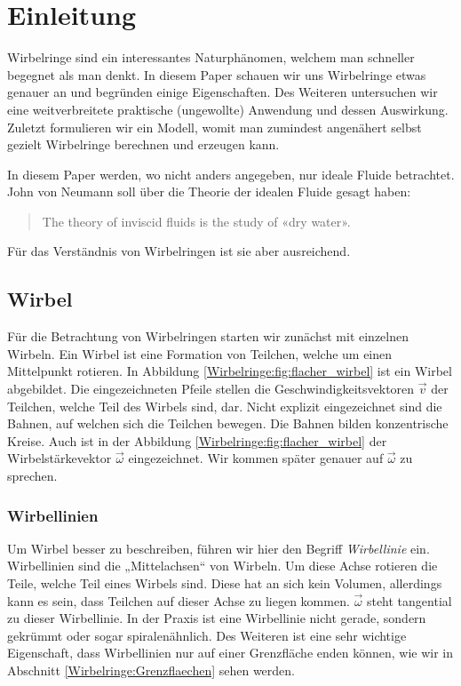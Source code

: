 %
%
%
\section{Einleitung}

Wirbelringe sind ein interessantes Naturphänomen, welchem man schneller begegnet als man denkt. 
In diesem Paper schauen wir uns Wirbelringe etwas genauer an und begründen einige Eigenschaften. 
Des Weiteren untersuchen wir eine weitverbreitete praktische (ungewollte) Anwendung und dessen Auswirkung. 
Zuletzt formulieren wir ein Modell, womit man zumindest angenähert selbst gezielt Wirbelringe berechnen und erzeugen kann.

In diesem Paper werden, wo nicht anders angegeben, nur ideale Fluide betrachtet.
John von Neumann soll über die Theorie der idealen Fluide gesagt haben\cite{Wirbelringe:feynman1964lectures}: 
\begin{quote}
    The theory of inviscid fluids is the study of «dry water».
\end{quote}
Für das Verständnis von Wirbelringen ist sie aber ausreichend.

\subsection{Wirbel}



Für die Betrachtung von Wirbelringen starten wir zunächst mit einzelnen Wirbeln.
Ein Wirbel ist eine Formation von Teilchen, welche um einen Mittelpunkt rotieren.
In Abbildung \ref{Wirbelringe:fig:flacher_wirbel} ist ein Wirbel abgebildet.
Die eingezeichneten Pfeile stellen die Geschwindigkeitsvektoren \( \vec{v} \) der Teilchen, welche Teil des Wirbels sind, dar.
Nicht explizit eingezeichnet sind die Bahnen, auf welchen sich die Teilchen bewegen.
Die Bahnen bilden konzentrische Kreise.
Auch ist in der Abbildung \ref{Wirbelringe:fig:flacher_wirbel} der Wirbelstärkevektor \(\vec{\omega}\) eingezeichnet.
Wir kommen später genauer auf \(\vec{\omega}\) zu sprechen.

\subsubsection*{Wirbellinien\label{Wirbelringe:Wirbellinien}}

Um Wirbel besser zu beschreiben, führen wir hier den Begriff {\em Wirbellinie} ein.
Wirbellinien sind die „Mittelachsen“ von Wirbeln. 
Um diese Achse rotieren die Teile, welche Teil eines Wirbels sind. 
Diese hat an sich kein Volumen, allerdings kann es sein, dass Teilchen auf dieser Achse zu liegen kommen. 
\(\vec{\omega}\) steht tangential zu dieser Wirbellinie.  
In der Praxis ist eine Wirbellinie nicht gerade, sondern gekrümmt oder sogar spiralenähnlich. 
Des Weiteren ist eine sehr wichtige Eigenschaft, dass Wirbellinien nur auf einer Grenzfläche enden können, 
wie wir in Abschnitt \ref{Wirbelringe:Grenzflaechen} sehen werden.

